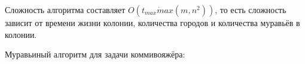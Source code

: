 \documentclass[12pt,a4paper]{scrartcl}
\begin{document}
Сложность алгоритма составляет $O(t_{max} \dot max(m,n^2))$, то есть сложность зависит от времени жизни колонии, количества городов и количества муравьёв в колонии. \cite{RECA}

\renewcommand{\listalgorithmname}{Список алгоритмов}

Муравьиный алгоритм для задачи коммивояжёра: \\
\end{document}

